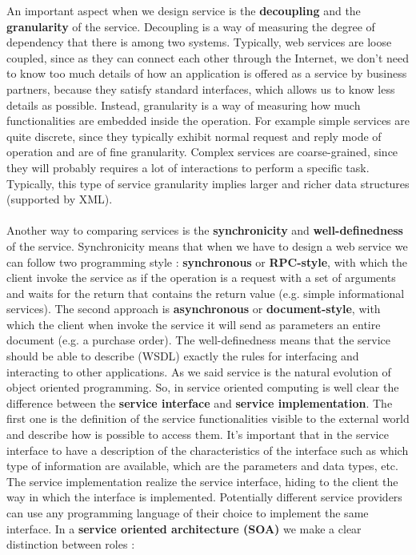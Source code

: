 \documentclass[11pt]{article}
\begin{document}
An important aspect when we design service is the \textbf{decoupling} and the \textbf{granularity} of the service. Decoupling is a way of measuring the degree of dependency that there is among two systems. Typically, web services are loose coupled, since as they can connect each other through the Internet, we don't need to know too much details of how an application is offered as a service by business partners, because they satisfy standard interfaces, which allows us to know less details as possible. Instead, granularity is a way of measuring how much functionalities are embedded inside the operation. For example simple services are quite discrete, since they typically exhibit normal request and reply mode of operation and are of fine granularity. Complex services are coarse-grained, since they will probably requires a lot of interactions to perform a specific task. Typically, this type of service granularity implies larger and richer data structures (supported by XML).\\\\Another way to comparing services is the \textbf{synchronicity} and \textbf{well-definedness} of the service. Synchronicity means that when we have to design a web service we can follow two programming style : \textbf{synchronous} or \textbf{RPC-style}, with which the client invoke the service as if the operation is a request with a set of arguments and waits for the return that contains the return value (e.g. simple informational services). The second approach is \textbf{asynchronous} or \textbf{document-style}, with which the client when invoke the service it will send as parameters an entire document (e.g. a purchase order). The well-definedness means that the service should be able to describe (WSDL) exactly the rules for interfacing and interacting to other applications. As we said service is the natural evolution of object oriented programming. So, in service oriented computing is well clear the difference between the \textbf{service interface} and \textbf{service implementation}. The first one is the definition of the service functionalities visible to the external world and describe how is possible to access them. It's important that in the service interface to have a description of the characteristics of the interface such as which type of information are available, which are the parameters and data types, etc. The service implementation realize the service interface, hiding to the client the way in which the interface is implemented. Potentially different service providers can use any programming language of their choice to implement the same interface. In a \textbf{service oriented architecture (SOA)} we make a clear distinction between roles :
\end{document}
